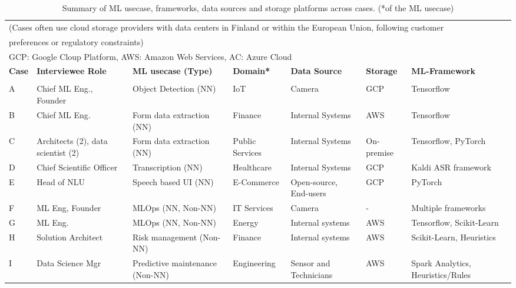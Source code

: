 

\begin{table*}[t]
 \centering
  \caption{Summary of ML usecase, frameworks, data sources and storage platforms across cases. (*of the ML usecase)}
  \begin{tabular}{p{}p{}p{3cm}p{}p{2cm}p{}p{}}
      
    \multicolumn{7}{l}{
    (Cases often use cloud storage providers with data centers in Finland or within the European Union, following customer}\\
    \multicolumn{7}{l}{ preferences or regulatory constraints) }\\
    \multicolumn{7}{l}{GCP: Google Cloup Platform, AWS: Amazon Web Services, AC: Azure Cloud}\\
    \toprule
    \textbf{Case} & \textbf{Interviewee Role} & \textbf{ML usecase (Type)} & \textbf{Domain*} &\textbf{Data Source} & \textbf{Storage} & \textbf{ML-Framework} \\
    \toprule \\
    A & Chief ML Eng., Founder & Object Detection (NN) & IoT & Camera & GCP & Tensorflow \\
    B & Chief ML Eng. & Form data extraction  (NN) & Finance & Internal Systems & AWS & Tensorflow \\
    C & Architects (2), data scientist (2) & Form data extraction (NN) & Public Services & Internal Systems & On-premise & Tensorflow, PyTorch \\
    D & Chief Scientific Officer & Transcription (NN) & Healthcare & Internal Systems & GCP & Kaldi ASR framework \\
    E & Head of NLU & Speech based UI (NN) & E-Commerce & Open-source, End-users & GCP & PyTorch \\
   F & ML Eng, Founder & MLOps (NN, Non-NN) & IT Services & Camera  & - & Multiple frameworks \\
    G & ML Eng. & MLOps (NN, Non-NN)  & Energy & Internal systems & AWS & Tensorflow, Scikit-Learn \\
    H & Solution Architect & Risk management (Non-NN) & Finance & Internal systems & AWS & Scikit-Learn, Heuristics \\
    I & Data Science Mgr & Predictive maintenance (Non-NN) & Engineering & Sensor and Technicians & AWS &  Spark Analytics, Heuristics/Rules \\

\end{tabular}
\end{table*}
